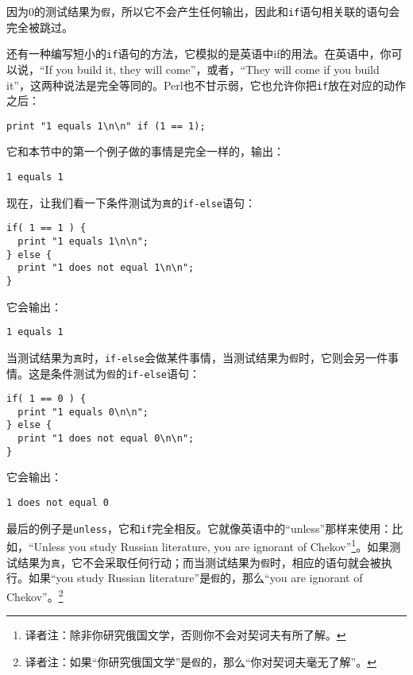 因为0的测试结果为\verb|假|，所以它不会产生任何输出，因此和\verb|if|语句相关联的语句会完全被跳过。

还有一种编写短小的\verb|if|语句的方法，它模拟的是英语中if的用法。在英语中，你可以说，“If you build it, they will come”，或者，“They will come if you build it”，这两种说法是完全等同的。Perl也不甘示弱，它也允许你把\verb|if|放在对应的动作之后：

\begin{lstlisting}
print "1 equals 1\n\n" if (1 == 1);
\end{lstlisting}

它和本节中的第一个例子做的事情是完全一样的，输出：

\begin{lstlisting}
1 equals 1
\end{lstlisting}

现在，让我们看一下条件测试为\verb|真|的\verb|if-else|语句：

\begin{lstlisting}
if( 1 == 1 ) {
  print "1 equals 1\n\n";
} else {
  print "1 does not equal 1\n\n";
}
\end{lstlisting}

它会输出：

\begin{lstlisting}
1 equals 1
\end{lstlisting}

当测试结果为\verb|真|时，\verb|if-else|会做某件事情，当测试结果为\verb|假|时，它则会另一件事情。这是条件测试为\verb|假|的\verb|if-else|语句：

\begin{lstlisting}
if( 1 == 0 ) {
  print "1 equals 0\n\n";
} else {
  print "1 does not equal 0\n\n";
}
\end{lstlisting}

它会输出：

\begin{lstlisting}
1 does not equal 0
\end{lstlisting}

最后的例子是\verb|unless|，它和\verb|if|完全相反。它就像英语中的“unless”那样来使用：比如，“Unless you study Russian literature, you are ignorant of Chekov”\footnote{译者注：除非你研究俄国文学，否则你不会对契诃夫有所了解。}。如果测试结果为\verb|真|，它不会采取任何行动；而当测试结果为\verb|假|时，相应的语句就会被执行。如果“you study Russian literature”是\verb|假|的，那么“you are ignorant of Chekov”。\footnote{译者注：如果“你研究俄国文学”是\verb|假|的，那么“你对契诃夫毫无了解”。}

